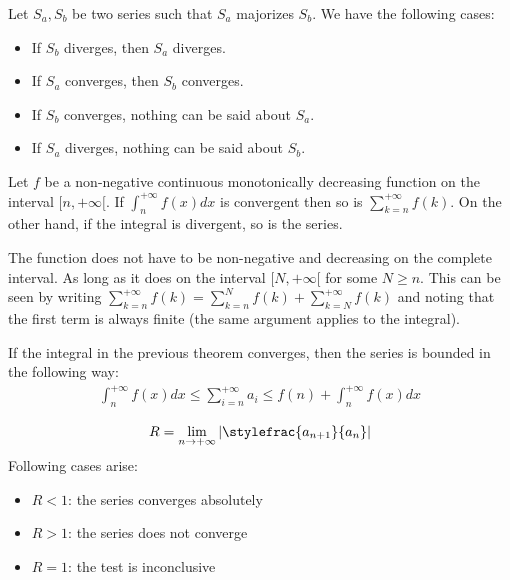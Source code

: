 	\begin{method}
		Let $S_a, S_b$ be two series such that $S_a$ majorizes $S_b$. We have the following cases:
	        \begin{itemize}
			\item If $S_b$ diverges, then $S_a$ diverges.
        		\item If $S_a$ converges, then $S_b$ converges.
		        \item If $S_b$ converges, nothing can be said about $S_a$.
		        \item If $S_a$ diverges, nothing can be said about $S_b$. 
		\end{itemize}
	\end{method}

	\begin{method}
		Let $f$ be a non-negative continuous monotonically decreasing function on the interval $[n,+\infty[$. If $\int_n^{+\infty}f(x)dx$ is convergent then so is $\sum_{k=n}^{+\infty}f(k)$. On the other hand, if the integral is divergent, so is the series.
	\end{method}
    	\begin{remark}
    		The function does not have to be non-negative and decreasing on the complete interval. As long as it does on the interval $[N,+\infty[$ for some $N\geq n$. This can be seen by writing $\sum_{k=n}^{+\infty}f(k) = \sum_{k=n}^Nf(k) + \sum_{k=N}^{+\infty}f(k)$ and noting that the first term is always finite (the same argument applies to the integral).
    	\end{remark}
    
	\begin{property}
		If the integral in the previous theorem converges, then the series is bounded in the following way:
	        \begin{gather}
			\int_n^{+\infty}f(x)dx \leq \sum_{i=n}^{+\infty}a_i \leq f(n) + \int_n^{+\infty}f(x)dx
		\end{gather}
	\end{property}

	\begin{method}
		\begin{gather}
			R = \lim_{n\rightarrow+\infty}\left|\stylefrac{a_{n+1}}{a_n}\right|
		\end{gather}
		Following cases arise:
	        \begin{itemize}
			\item $R < 1$: the series converges absolutely
		        \item $R > 1$: the series does not converge
		        \item $R = 1$: the test is inconclusive
		\end{itemize}
	\end{method}

